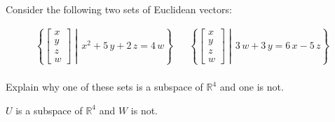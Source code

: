 
\begin{exerciseStatement}


Consider the following two sets of Euclidean vectors: 


\begin{align*}  \left\{ \left[\begin{array}{c}
x \\
y \\
z \\
w
\end{array}\right] \middle|\,x^{2} + 5 \, y + 2 \, z = 4 \, w\right\}  & &   \left\{ \left[\begin{array}{c}
x \\
y \\
z \\
w
\end{array}\right] \middle|\,3 \, w + 3 \, y = 6 \, x - 5 \, z\right\}  \\ \end{align*}
            

 Explain why one of these sets is a subspace of \(\mathbb{R}^ 4 \) and one is not. 


\end{exerciseStatement}
    
\begin{exerciseAnswer} 


\(U\) is a subspace of \(\mathbb{R}^ 4 \) and \(W\) is not.


\end{exerciseAnswer}
    
